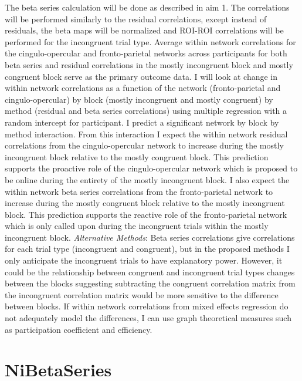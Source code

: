 \documentclass[phd,appendix,figures]{uithesis}
\begin{document}
The beta series calculation will be done as described in aim 1.
The correlations will be performed similarly to the residual correlations, except instead of residuals, the beta maps will be normalized and ROI-ROI correlations will be performed for the incongruent trial type.
Average within network correlations for the cingulo-opercular and fronto-parietal networks across participants for both beta series and residual correlations in the mostly incongruent block and mostly congruent block serve as the primary outcome data.
I will look at change in within network correlations as a function of the network (fronto-parietal and cingulo-opercular) by block (mostly incongruent and mostly congruent) by method (residual and beta series correlations) using multiple regression with a random intercept for participant.
I predict a significant network by block by method interaction.
From this interaction I expect the within network residual correlations from the cingulo-opercular network to increase during the mostly incongruent block relative to the mostly congruent block.
This prediction supports the proactive role of the cingulo-opercular network which is proposed to be online during the entirety of the mostly incongruent block.
I also expect the within network beta series correlations from the fronto-parietal network to increase during the mostly congruent block relative to the mostly incongruent block.
This prediction supports the reactive role of the fronto-parietal network which is only called upon during the incongruent trials within the mostly incongruent block.
\newline
\newline
\textit{Alternative Methods}:
Beta series correlations give correlations for each trial type (incongruent and congruent), but in the proposed methods I only anticipate the incongruent trials to have explanatory power.
However, it could be the relationship between congruent and incongruent trial types changes between the blocks suggesting subtracting the congruent correlation matrix from the incongruent correlation matrix would be more sensitive to the difference between blocks.  
If within network correlations from mixed effects regression do not adequately model the differences, I can use graph theoretical measures such as participation coefficient and efficiency.
\newline

\chapter{NiBetaSeries}
\end{document}
